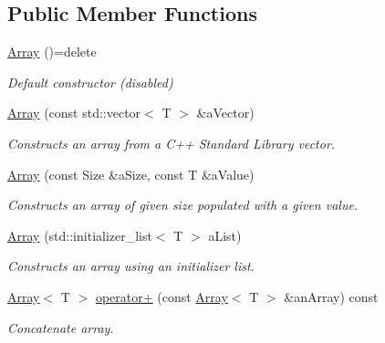 \subsection*{Public Member Functions}
\begin{DoxyCompactItemize}
\item 
\mbox{\label{classlibrary_1_1core_1_1ctnr_1_1_array_a95de936b24bfdf0a5d24ef45df892ecf}} 
\hyperlink{classlibrary_1_1core_1_1ctnr_1_1_array_a95de936b24bfdf0a5d24ef45df892ecf}{Array} ()=delete
\begin{DoxyCompactList}\small\item\em Default constructor (disabled) \end{DoxyCompactList}\item 
\hyperlink{classlibrary_1_1core_1_1ctnr_1_1_array_a9b510b4e2a3f9d4a324dfd0feba01285}{Array} (const std\+::vector$<$ T $>$ \&a\+Vector)
\begin{DoxyCompactList}\small\item\em Constructs an array from a C++ Standard Library vector. \end{DoxyCompactList}\item 
\hyperlink{classlibrary_1_1core_1_1ctnr_1_1_array_a647190cec3e259a8d8ad173c18bf3020}{Array} (const Size \&a\+Size, const T \&a\+Value)
\begin{DoxyCompactList}\small\item\em Constructs an array of given size populated with a given value. \end{DoxyCompactList}\item 
\hyperlink{classlibrary_1_1core_1_1ctnr_1_1_array_adcda1d4d28575b580a978406107febbb}{Array} (std\+::initializer\+\_\+list$<$ T $>$ a\+List)
\begin{DoxyCompactList}\small\item\em Constructs an array using an initializer list. \end{DoxyCompactList}\item 
\hyperlink{classlibrary_1_1core_1_1ctnr_1_1_array}{Array}$<$ T $>$ \hyperlink{classlibrary_1_1core_1_1ctnr_1_1_array_a5d65732e2a07b268d9def2da3c955002}{operator+} (const \hyperlink{classlibrary_1_1core_1_1ctnr_1_1_array}{Array}$<$ T $>$ \&an\+Array) const
\begin{DoxyCompactList}\small\item\em Concatenate array. \end{DoxyCompactList}\item 

\end{DoxyCompactItemize}
